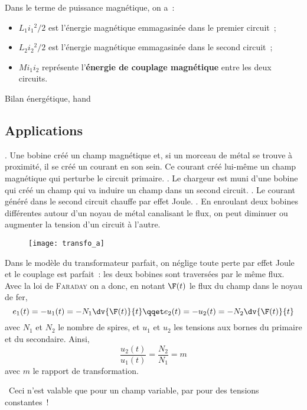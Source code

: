 \documentclass[../main/main.tex]{subfiles}
\begin{document}
Dans le terme de puissance magnétique, on a~:
\begin{itemize}[label=$\diamond$, leftmargin=10pt]
  \item $L_1i_1{}^{2}/2$ est l'énergie magnétique emmagasinée dans le premier
    circuit~;
  \item $L_2i_2{}^{2}/2$ est l'énergie magnétique emmagasinée dans le second
    circuit~;
  \item $Mi_1i_2$ représente l'\textbf{énergie de couplage magnétique} entre les
    deux circuits.
\end{itemize}
\begin{tror}{Bilan énergétique, hand}
  \vspace*{-10pt}
\end{tror}

\subsection{Applications}
\label{ssec:cplimpl}
\begin{itemize}[label=$\diamond$, leftmargin=10pt]
  . Une bobine
  créé un champ magnétique et, si un morceau de métal se trouve à proximité, il
  se créé un courant en son sein. Ce courant créé lui-même un champ magnétique
  qui perturbe le circuit primaire.
  . Le chargeur
  est muni d'une bobine qui créé un champ qui va induire un champ dans un second
  circuit.
  . Le courant généré dans le second circuit
  chauffe par effet Joule.
  . En enroulant deux bobines différentes
  autour d'un noyau de métal canalisant le flux, on peut diminuer ou augmenter
  la tension d'un circuit à l'autre.
\end{itemize}

\begin{figure}[h]
  \centering
  \texttt{[image: transfo\_a]}
  \label{fig:transfo}
\end{figure}
Dans le modèle du transformateur parfait, on néglige toute perte par effet Joule
et le couplage est parfait~: les deux bobines sont traversées par le même flux.
Avec la loi de \textsc{Faraday} on a donc, en notant $\F(t)$ le flux du champ
dans le noyau de fer,
\[
  e_1(t) = -u_1(t) = -N_1 \dv{\F(t)}{t}
  \qqet
  e_2(t) = -u_2(t) = -N_2 \dv{\F(t)}{t}
\]
avec $N_1$ et $N_2$ le nombre de spires, et $u_1$ et $u_2$ les tensions aux
bornes du primaire et du secondaire. Ainsi,
\[
  \boxed{\frac{u_2(t)}{u_1(t)} = \frac{N_2}{N_1} = m}
\]
avec $m$ le rapport de transformation.
\begin{center}
  \danger\ Ceci n'est valable que pour un champ variable, par pour des tensions
  constantes~! \danger\
\end{center}
\end{document}
